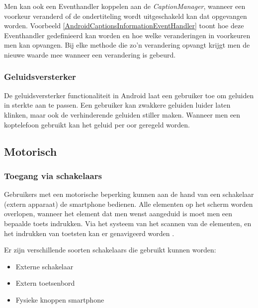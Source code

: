 

Men kan ook een Eventhandler koppelen aan de \emph{CaptionManager}, wanneer een voorkeur veranderd of de ondertiteling wordt uitgeschakeld kan dat opgevangen worden. Voorbeeld \ref{AndroidCaptionsInformationEventHandler} toont hoe deze Eventhandler gedefinieerd kan worden en hoe welke veranderingen in voorkeuren men kan opvangen. Bij elke methode die zo'n verandering opvangt krijgt men de nieuwe waarde mee wanneer een verandering is gebeurd.
\subsubsection{Geluidsversterker}
De geluidsversterker functionaliteit in Android laat een gebruiker toe om geluiden in sterkte aan te passen. Een gebruiker kan zwakkere geluiden luider laten klinken, maar ook de verhinderende geluiden stiller maken. Wanneer men een koptelefoon gebruikt kan het geluid per oor geregeld worden.
\subsection{Motorisch}
\subsubsection{Toegang via schakelaars}
\label{subsec:schakelAndroid}
Gebruikers met een motorische beperking kunnen aan de hand van een schakelaar (extern apparaat) de smartphone bedienen. Alle elementen op het scherm worden overlopen, wanneer het element dat men wenst aangeduid is moet men een bepaalde toets indrukken. Via het systeem van het scannen van de elementen, en het indrukken van toetsten kan er genavigeerd worden \autocite{switchAndroid}.

Er zijn verschillende soorten schakelaars die gebruikt kunnen worden: 
\begin{itemize}
    \item Externe schakelaar
    \item Extern toetsenbord
    \item Fysieke knoppen smartphone
\end{itemize}

    

